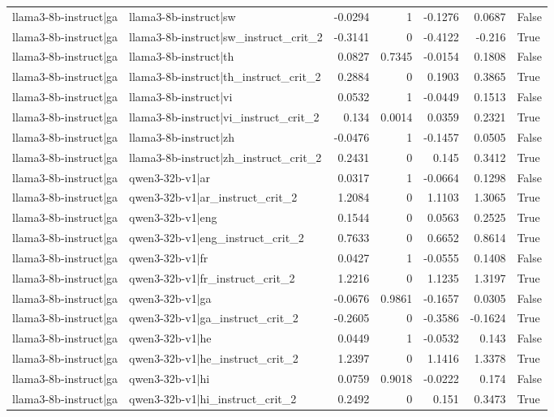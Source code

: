 \begin{table}
\begin{tabular}{l l r r r r l}
llama3-8b-instruct|ga & llama3-8b-instruct|sw & -0.0294 & 1 & -0.1276 & 0.0687 & False \\
llama3-8b-instruct|ga & llama3-8b-instruct|sw_instruct_crit_2 & -0.3141 & 0 & -0.4122 & -0.216 & True \\
llama3-8b-instruct|ga & llama3-8b-instruct|th & 0.0827 & 0.7345 & -0.0154 & 0.1808 & False \\
llama3-8b-instruct|ga & llama3-8b-instruct|th_instruct_crit_2 & 0.2884 & 0 & 0.1903 & 0.3865 & True \\
llama3-8b-instruct|ga & llama3-8b-instruct|vi & 0.0532 & 1 & -0.0449 & 0.1513 & False \\
llama3-8b-instruct|ga & llama3-8b-instruct|vi_instruct_crit_2 & 0.134 & 0.0014 & 0.0359 & 0.2321 & True \\
llama3-8b-instruct|ga & llama3-8b-instruct|zh & -0.0476 & 1 & -0.1457 & 0.0505 & False \\
llama3-8b-instruct|ga & llama3-8b-instruct|zh_instruct_crit_2 & 0.2431 & 0 & 0.145 & 0.3412 & True \\
llama3-8b-instruct|ga & qwen3-32b-v1|ar & 0.0317 & 1 & -0.0664 & 0.1298 & False \\
llama3-8b-instruct|ga & qwen3-32b-v1|ar_instruct_crit_2 & 1.2084 & 0 & 1.1103 & 1.3065 & True \\
llama3-8b-instruct|ga & qwen3-32b-v1|eng & 0.1544 & 0 & 0.0563 & 0.2525 & True \\
llama3-8b-instruct|ga & qwen3-32b-v1|eng_instruct_crit_2 & 0.7633 & 0 & 0.6652 & 0.8614 & True \\
llama3-8b-instruct|ga & qwen3-32b-v1|fr & 0.0427 & 1 & -0.0555 & 0.1408 & False \\
llama3-8b-instruct|ga & qwen3-32b-v1|fr_instruct_crit_2 & 1.2216 & 0 & 1.1235 & 1.3197 & True \\
llama3-8b-instruct|ga & qwen3-32b-v1|ga & -0.0676 & 0.9861 & -0.1657 & 0.0305 & False \\
llama3-8b-instruct|ga & qwen3-32b-v1|ga_instruct_crit_2 & -0.2605 & 0 & -0.3586 & -0.1624 & True \\
llama3-8b-instruct|ga & qwen3-32b-v1|he & 0.0449 & 1 & -0.0532 & 0.143 & False \\
llama3-8b-instruct|ga & qwen3-32b-v1|he_instruct_crit_2 & 1.2397 & 0 & 1.1416 & 1.3378 & True \\
llama3-8b-instruct|ga & qwen3-32b-v1|hi & 0.0759 & 0.9018 & -0.0222 & 0.174 & False \\
llama3-8b-instruct|ga & qwen3-32b-v1|hi_instruct_crit_2 & 0.2492 & 0 & 0.151 & 0.3473 & True \\

\end{tabular}
\end{table}
